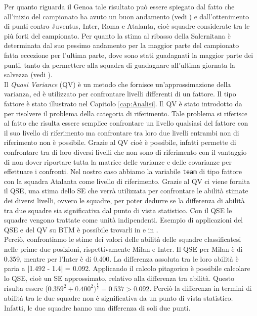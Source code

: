 Per quanto riguarda il Genoa tale risultato può essere spiegato dal fatto che all'inizio del campionato ha avuto un buon andamento (vedi \textit{\cite{storyGenoa}}) e dall'ottenimento di punti contro Juventus, Inter, Roma e Atalanta, cioè squadre considerate tra le più forti del campionato. Per quanto la stima al ribasso della Salernitana è determinata dal suo pessimo andamento per la maggior parte del campionato fatta eccezione per l'ultima parte, dove sono stati guadagnati la maggior parte dei punti, tanto da permettere alla squadra di guadagnare all'ultima giornata la salvezza (vedi \textit{\cite{storySal}}). \\
Il \emph{Quasi Variance} (QV)\autocite{firth2004quasi} è un metodo che fornisce un'approssimazione della varianza, ed è utilizzato per confrontare livelli differenti di un fattore. Il tipo fattore è stato illustrato nel Capitolo \ref{cap:Analisi}. Il QV è stato introdotto da \textcite{firth2004quasi} per risolvere il problema della categoria di riferimento. Tale problema si riferisce al fatto che risulta essere semplice confrontare un livello qualsiasi del fattore con il suo livello di riferimento ma confrontare tra loro due livelli entrambi non di riferimento non è possibile. Grazie al QV cioè è possibile, infatti permette di confrontare tra di loro diversi livelli che non sono di riferimento con il vantaggio di non dover riportare tutta la matrice delle varianze e delle covarianze per effettuare i confronti. Nel nostro caso abbiamo la variabile \texttt{team} di tipo fattore con la squadra Atalanta come livello di riferimento. Grazie al QV ci viene fornita il QSE, una stima dello SE che verrà utilizzata per confrontare le abilità stimate dei diversi livelli, ovvero le squadre, per poter dedurre se la differenza di abilità tra due squadre sia significativa dal punto di vista statistico. Con il QSE le squadre vengono trattate come unità indipendenti. Esempio di applicazioni del QSE e del QV su BTM è possibile trovarli in \textcite{firth2004quasi} e in \textcite{turner2012bradley}.\\
Perciò, confrontiamo le stime dei valori delle abilità delle squadre classificatesi nelle prime due posizioni, rispettivamente Milan e Inter. Il QSE per Milan è di 0.359, mentre per l'Inter è di 0.400. La differenza assoluta tra le loro abilità è paria a |1.492 - 1.4| = 0.092. Applicando il calcolo pitagorico è possibile calcolare lo QSE, cioè un SE approssimato, relativo alla differenza tra abilità. Questo risulta essere ($0.359^2 + 0.400^2)^\frac{1}{2}=0.537 > 0.092$. Perciò la differenza in termini di abilità tra le due squadre non è significativa da un punto di vista statistico. Infatti, le due squadre hanno una differenza di soli due punti.

